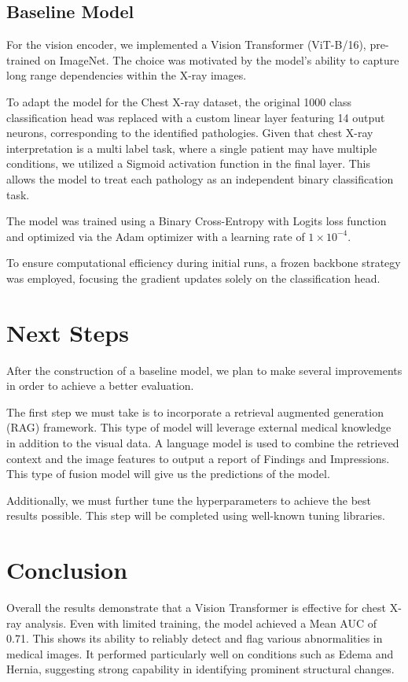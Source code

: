 \documentclass{article}
\begin{document}
\subsection{Baseline Model}
For the vision encoder, we implemented a Vision Transformer (ViT-B/16), pre-trained on ImageNet. The choice was motivated by the model's ability to capture long range dependencies within the X-ray images.

To adapt the model for the Chest X-ray dataset, the original 1000 class classification head was replaced with a custom linear layer featuring 14 output neurons, corresponding to the identified pathologies. Given that chest X-ray interpretation is a multi label task, where a single patient may have multiple conditions, we utilized a Sigmoid activation function in the final layer. This allows the model to treat each pathology as an independent binary classification task. 

The model was trained using a Binary Cross-Entropy with Logits loss function and optimized via the Adam optimizer with a learning rate of $1 \times 10^{-4}$. 

To ensure computational efficiency during initial runs, a frozen backbone strategy was employed, focusing the gradient updates solely on the classification head.

\section{Next Steps}
After the construction of a baseline model, we plan to make several improvements in order to achieve a better evaluation.

The first step we must take is to incorporate a retrieval augmented generation (RAG) framework. This type of model will leverage external medical knowledge in addition to the visual data. A language model is used to combine the retrieved context and the image features to output a report of Findings and Impressions. This type of fusion model will give us the predictions of the model.

Additionally, we must further tune the hyperparameters to achieve the best results possible. This step will be completed using well-known tuning libraries.

\section{Conclusion}
Overall the results demonstrate that a Vision Transformer is effective for chest X-ray analysis. Even with limited training, the model achieved a Mean AUC of 0.71. This shows its ability to reliably detect and flag various abnormalities in medical images. It performed particularly well on conditions such as Edema and Hernia, suggesting strong capability in identifying prominent structural changes.
\end{document}
